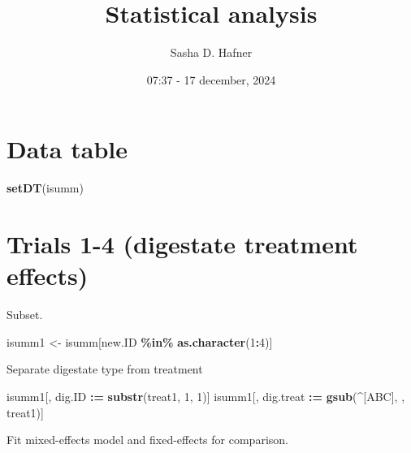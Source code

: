 \documentclass[
]{article}
\title{Statistical analysis}
\author{Sasha D. Hafner}
\date{07:37 - 17 december, 2024}
\newenvironment{Shaded}{\begin{snugshade}}{\end{snugshade}}
\newcommand{\DecValTok}[1]{\textcolor[rgb]{0.00,0.00,0.81}{#1}}
\newcommand{\FunctionTok}[1]{\textcolor[rgb]{0.13,0.29,0.53}{\textbf{#1}}}
\newcommand{\NormalTok}[1]{#1}
\newcommand{\OtherTok}[1]{\textcolor[rgb]{0.56,0.35,0.01}{#1}}
\newcommand{\SpecialCharTok}[1]{\textcolor[rgb]{0.81,0.36,0.00}{\textbf{#1}}}
\newcommand{\StringTok}[1]{\textcolor[rgb]{0.31,0.60,0.02}{#1}}
\begin{document}
\maketitle

\section{Data table}\label{data-table}

\begin{Shaded}
\begin{Highlighting}[]
\FunctionTok{setDT}\NormalTok{(isumm)}
\end{Highlighting}
\end{Shaded}

\section{Trials 1-4 (digestate treatment
effects)}\label{trials-1-4-digestate-treatment-effects}

Subset.

\begin{Shaded}
\begin{Highlighting}[]
\NormalTok{isumm1 }\OtherTok{\textless{}{-}}\NormalTok{ isumm[new.ID }\SpecialCharTok{\%in\%} \FunctionTok{as.character}\NormalTok{(}\DecValTok{1}\SpecialCharTok{:}\DecValTok{4}\NormalTok{)]}
\end{Highlighting}
\end{Shaded}

Separate digestate type from treatment

\begin{Shaded}
\begin{Highlighting}[]
\NormalTok{isumm1[, dig.ID }\SpecialCharTok{:=} \FunctionTok{substr}\NormalTok{(treat1, }\DecValTok{1}\NormalTok{, }\DecValTok{1}\NormalTok{)]}
\NormalTok{isumm1[, dig.treat }\SpecialCharTok{:=} \FunctionTok{gsub}\NormalTok{(}\StringTok{\textquotesingle{}\^{}[ABC]\textquotesingle{}}\NormalTok{, }\StringTok{\textquotesingle{}\textquotesingle{}}\NormalTok{, treat1)]}
\end{Highlighting}
\end{Shaded}

Fit mixed-effects model and fixed-effects for comparison.
\end{document}
